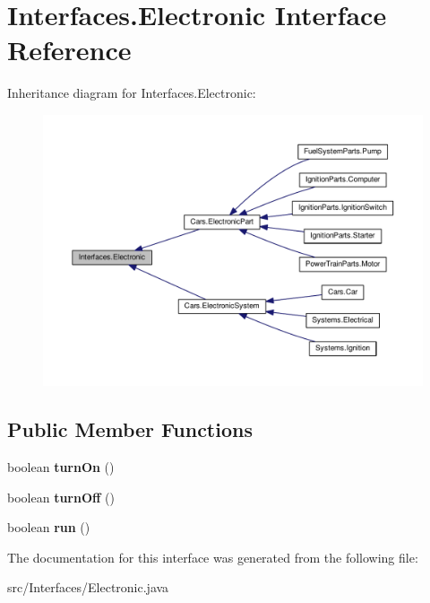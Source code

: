 \hypertarget{interfaceInterfaces_1_1Electronic}{}\section{Interfaces.\+Electronic Interface Reference}
\label{interfaceInterfaces_1_1Electronic}


Inheritance diagram for Interfaces.\+Electronic\+:\nopagebreak
\begin{figure}[H]
\begin{center}
\leavevmode
\includegraphics[width=350pt]{interfaceInterfaces_1_1Electronic__inherit__graph}
\end{center}
\end{figure}
\subsection*{Public Member Functions}
\begin{DoxyCompactItemize}
\item 
\hypertarget{interfaceInterfaces_1_1Electronic_ad3cbfe349692b0e1f546db7a1d3ecff2}{}boolean {\bfseries turn\+On} ()\label{interfaceInterfaces_1_1Electronic_ad3cbfe349692b0e1f546db7a1d3ecff2}

\item 
\hypertarget{interfaceInterfaces_1_1Electronic_a681234c8e833d9098bc947e033638aa8}{}boolean {\bfseries turn\+Off} ()\label{interfaceInterfaces_1_1Electronic_a681234c8e833d9098bc947e033638aa8}

\item 
\hypertarget{interfaceInterfaces_1_1Electronic_a7c76f201202f27a6ee9da422a294fadd}{}boolean {\bfseries run} ()\label{interfaceInterfaces_1_1Electronic_a7c76f201202f27a6ee9da422a294fadd}

\end{DoxyCompactItemize}


The documentation for this interface was generated from the following file\+:\begin{DoxyCompactItemize}
\item 
src/\+Interfaces/Electronic.\+java\end{DoxyCompactItemize}
